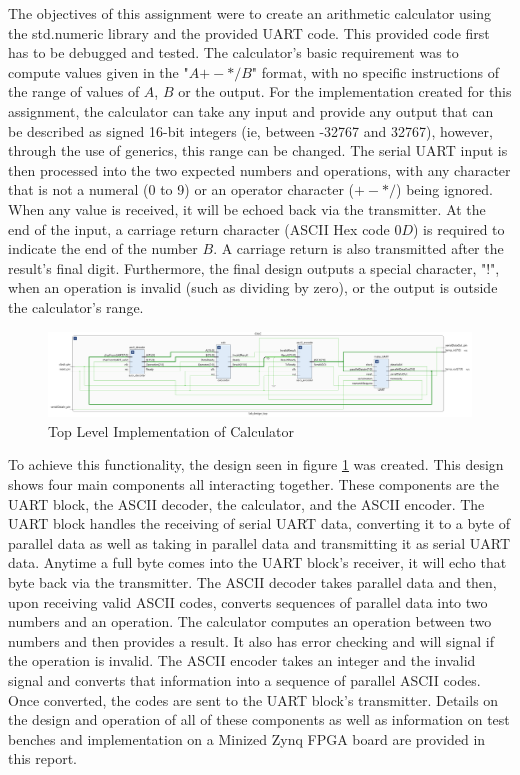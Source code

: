 \documentclass[11pt]{article}
\begin{document}
The objectives of this assignment were to create an arithmetic calculator using the std.numeric library and the provided UART code.
This provided code first has to be debugged and tested.
The calculator's basic requirement was to compute values given in the "$A {+-*/} B$" format, with no specific instructions of the range of values of $A$, $B$ or the output.
For the implementation created for this assignment, the calculator can take any input and provide any output that can be described as signed 16-bit integers (ie, between -32767 and 32767),
however, through the use of generics, this range can be changed.
The serial UART input is then processed into the two expected numbers and operations, with any character that is not a numeral (0 to 9) or an operator character ($+-*/$) being ignored.
When any value is received, it will be echoed back via the transmitter.
At the end of the input, a carriage return character (ASCII Hex code $0D$) is required to indicate the end of the number $B$.
A carriage return is also transmitted after the result's final digit.
Furthermore, the final design outputs a special character, "!", when an operation is invalid (such as dividing by zero), or the output is outside the calculator's range.

\begin{figure}[H]        
    \centering
    \includegraphics[width=\textwidth]{TopLevelImp.png}
    \caption{Top Level Implementation of Calculator}
    \label{fig:toplevel}
\end{figure} 

To achieve this functionality, the design seen in figure \ref{fig:toplevel} was created.
This design shows four main components all interacting together.
These components are the UART block, the ASCII decoder, the calculator, and the ASCII encoder.
The UART block handles the receiving of serial UART data, converting it to a byte of parallel data as well as taking in parallel data and transmitting it as serial UART data.
Anytime a full byte comes into the UART block's receiver, it will echo that byte back via the transmitter.
The ASCII decoder takes parallel data and then, upon receiving valid ASCII codes, converts sequences of parallel data into two numbers and an operation.
The calculator computes an operation between two numbers and then provides a result.
It also has error checking and will signal if the operation is invalid.
The ASCII encoder takes an integer and the invalid signal and converts that information into a sequence of parallel ASCII codes.
Once converted, the codes are sent to the UART block's transmitter.
Details on the design and operation of all of these components as well as information on test benches and implementation on a Minized Zynq FPGA board are provided in this report.
\end{document}
